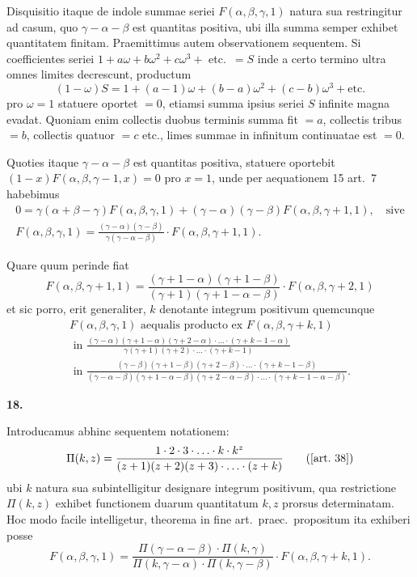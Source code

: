 \documentclass[12pt,a4paper]{article}
\newcommand{\art}[1]{\par\medskip\noindent\textbf{#1.}\par\nopagebreak\smallskip}
\begin{document}
Disquisitio itaque de indole summae seriei $F(\alpha,\beta,\gamma,1)$ natura sua restringitur ad casum, quo $\gamma-\alpha-\beta$ est quantitas positiva, ubi illa summa semper exhibet quantitatem finitam. Praemittimus autem observationem sequentem. Si coefficientes seriei $1+a\omega+b\omega^2+c\omega^3+$ etc.\ $=S$ inde a certo termino ultra omnes limites decrescunt, productum
\[
(1-\omega)S = 1 + (a-1)\omega + (b-a)\omega^2 + (c-b)\omega^3 + \text{etc.}
\]
pro $\omega=1$ statuere oportet $=0$, etiamsi summa ipsius seriei $S$ infinite magna evadat. Quoniam enim collectis duobus terminis summa fit $=a$, collectis tribus $=b$, collectis quatuor $=c$ etc., limes summae in infinitum continuatae est $=0$.

Quoties itaque $\gamma-\alpha-\beta$ est quantitas positiva, statuere oportebit $(1-x)F(\alpha,\beta,\gamma-1,x)=0$ pro $x=1$, unde per aequationem 15 art.\ 7 habebimus
\begin{gather*}
0 = \gamma(\alpha+\beta-\gamma)F(\alpha,\beta,\gamma,1) + (\gamma-\alpha)(\gamma-\beta)F(\alpha,\beta,\gamma+1,1),\quad \text{sive}\\[0.5em]
F(\alpha,\beta,\gamma,1) = \frac{(\gamma-\alpha)(\gamma-\beta)}{\gamma(\gamma-\alpha-\beta)}\cdot F(\alpha,\beta,\gamma+1,1).\tag{38}
\end{gather*}

Quare quum perinde fiat
\[
F(\alpha,\beta,\gamma+1,1) = \frac{(\gamma+1-\alpha)(\gamma+1-\beta)}{(\gamma+1)(\gamma+1-\alpha-\beta)}\cdot F(\alpha,\beta,\gamma+2,1)
\]
et sic porro, erit generaliter, $k$ denotante integrum positivum quemcunque
\begin{multline}
F(\alpha,\beta,\gamma,1) \text{ aequalis producto ex } F(\alpha,\beta,\gamma+k,1)\\
\text{ in } \frac{(\gamma-\alpha)(\gamma+1-\alpha)(\gamma+2-\alpha)\cdot\ldots\cdot(\gamma+k-1-\alpha)}{\gamma(\gamma+1)(\gamma+2)\cdot\ldots\cdot(\gamma+k-1)}\\
\text{ in } \frac{(\gamma-\beta)(\gamma+1-\beta)(\gamma+2-\beta)\cdot\ldots\cdot(\gamma+k-1-\beta)}{(\gamma-\alpha-\beta)(\gamma+1-\alpha-\beta)(\gamma+2-\alpha-\beta)\cdot\ldots\cdot(\gamma+k-1-\alpha-\beta)}.\tag{39}
\end{multline}

\art{18}

Introducamus abhinc sequentem notationem:
\begin{equation}
\Pi(k,z) = \frac{1\cdot2\cdot3\cdot\ldots\cdot k\cdot k^z}{(z+1)(z+2)(z+3)\cdot\ldots\cdot(z+k)}\tag{[\text{art.\ }38]}
\end{equation}
ubi $k$ natura sua subintelligitur designare integrum positivum, qua restrictione $\Pi(k,z)$ exhibet functionem duarum quantitatum $k,z$ prorsus determinatam. Hoc modo facile intelligetur, theorema in fine art.\ praec.\ propositum ita exhiberi posse
\begin{equation}
F(\alpha,\beta,\gamma,1) = \frac{\Pi(\gamma-\alpha-\beta)\cdot\Pi(k,\gamma)}{\Pi(k,\gamma-\alpha)\cdot\Pi(k,\gamma-\beta)}\cdot F(\alpha,\beta,\gamma+k,1).\tag{[39]}
\end{equation}
\end{document}
